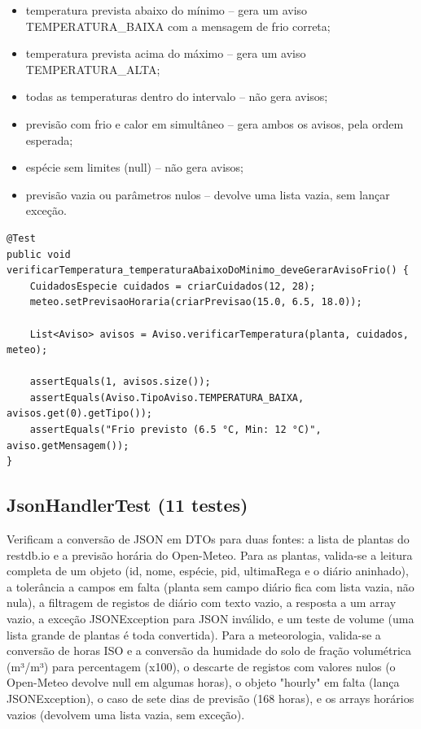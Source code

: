 \documentclass[runningheads,a4paper]{llncs}
\begin{document}
\begin{itemize}
  \item temperatura prevista abaixo do mínimo -- gera um aviso
        TEMPERATURA\_BAIXA com a mensagem de frio correta;
  \item temperatura prevista acima do máximo -- gera um aviso
        TEMPERATURA\_ALTA;
  \item todas as temperaturas dentro do intervalo -- não gera avisos;
  \item previsão com frio e calor em simultâneo -- gera ambos os avisos,
        pela ordem esperada;
  \item espécie sem limites (null) -- não gera avisos;
  \item previsão vazia ou parâmetros nulos -- devolve uma lista vazia,
        sem lançar exceção.
\end{itemize}

\begin{lstlisting}[caption={AvisoTest -- aviso de frio com mensagem exata},label=lst:avisotest,xleftmargin=-2cm, xrightmargin=-2cm]
@Test
public void verificarTemperatura_temperaturaAbaixoDoMinimo_deveGerarAvisoFrio() {
    CuidadosEspecie cuidados = criarCuidados(12, 28);
    meteo.setPrevisaoHoraria(criarPrevisao(15.0, 6.5, 18.0));

    List<Aviso> avisos = Aviso.verificarTemperatura(planta, cuidados, meteo);

    assertEquals(1, avisos.size());
    assertEquals(Aviso.TipoAviso.TEMPERATURA_BAIXA, avisos.get(0).getTipo());
    assertEquals("Frio previsto (6.5 °C, Min: 12 °C)", aviso.getMensagem());
}
\end{lstlisting}

\subsection{JsonHandlerTest (11 testes)}

Verificam a conversão de JSON em DTOs para duas fontes:
a lista de plantas do restdb.io e a previsão horária do Open-Meteo.
Para as plantas, valida-se a leitura completa de um objeto (id, nome, espécie,
pid, ultimaRega e o diário aninhado), a tolerância a campos em falta (planta
sem campo diário fica com lista vazia, não nula), a filtragem de registos de
diário com texto vazio, a resposta a um array vazio, a exceção
JSONException para JSON inválido, e um teste de volume (uma lista grande de
plantas é toda convertida). Para a meteorologia, valida-se a conversão de
horas ISO e a conversão da humidade do solo de fração volumétrica
(m³/m³) para percentagem (x100), o descarte de registos com valores nulos
(o Open-Meteo devolve null em algumas horas), o objeto "hourly" em falta
(lança JSONException), o caso de sete dias de previsão (168 horas), e os
arrays horários vazios (devolvem uma lista vazia, sem exceção).
\end{document}
